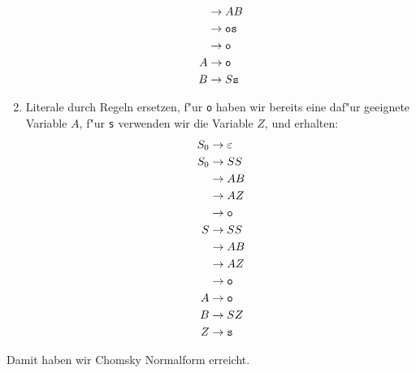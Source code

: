 \begin{loesung}
\begin{enumerate}
\begin{align*}
 &\rightarrow AB\\
 &\rightarrow {\tt o}{\tt s}\\
 &\rightarrow {\tt o}\\
A&\rightarrow {\tt o}\\
B&\rightarrow S{\tt s}
\end{align*}
\item Literale durch Regeln ersetzen, f"ur {\tt o} haben wir bereits
eine daf"ur geeignete Variable  $A$, f"ur {\tt s} verwenden wir die
Variable $Z$, und erhalten:
\begin{align*}
S_0&\rightarrow \varepsilon\\
S_0&\rightarrow SS\\
   &\rightarrow AB\\
   &\rightarrow AZ\\
   &\rightarrow {\tt o}\\
S&\rightarrow SS\\
 &\rightarrow AB\\
 &\rightarrow AZ\\
 &\rightarrow {\tt o}\\
A&\rightarrow {\tt o}\\
B&\rightarrow SZ\\
Z&\rightarrow {\tt s}
\end{align*}
\end{enumerate}
Damit haben wir Chomsky Normalform erreicht.
\end{loesung}
